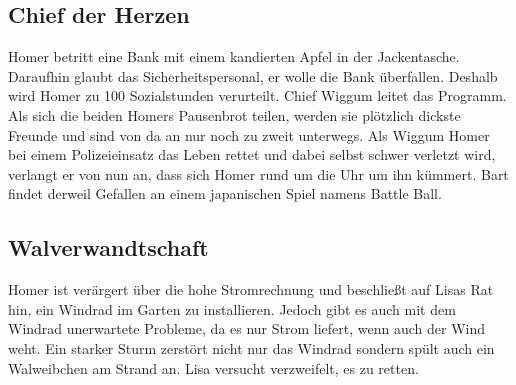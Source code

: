 

\subsection{Chief der Herzen}\label{MABF09}
Homer betritt eine Bank mit einem kandierten Apfel in der Jackentasche. Daraufhin glaubt das Sicherheitspersonal, er wolle die Bank überfallen. Deshalb wird Homer zu 100 Sozialstunden verurteilt. Chief Wiggum leitet das Programm. Als sich die beiden Homers Pausenbrot teilen, werden sie plötzlich dickste Freunde und sind von da an nur noch zu zweit unterwegs. Als Wiggum Homer bei einem Polizeieinsatz das Leben rettet und dabei selbst schwer verletzt wird, verlangt er von nun an, dass sich Homer rund um die Uhr um ihn kümmert. Bart findet derweil Gefallen an einem japanischen Spiel namens Battle Ball.


\subsection{Walverwandtschaft}
Homer ist verärgert über die hohe Stromrechnung und beschließt auf Lisas Rat hin, ein Windrad im Garten zu installieren. Jedoch gibt es auch mit dem Windrad unerwartete Probleme, da es nur Strom liefert, wenn auch der Wind weht. Ein starker Sturm zerstört nicht nur das Windrad sondern spült auch ein Walweibchen am Strand an. Lisa versucht verzweifelt, es zu retten.

